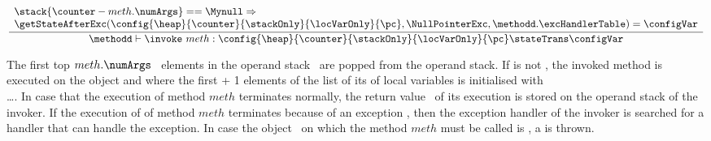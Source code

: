 \begin{itemize}
	  $$ \frac{\begin{array}{l}
	                         \stack{ \counter - meth.\numArgs } == \Mynull \Rightarrow \\ 
				 \getStateAfterExc( \config{\heap}{\counter}{\stackOnly}{\locVarOnly}{\pc},\NullPointerExc,\methodd.\excHandlerTable ) =  \configVar
	         \end{array} 	      
	         }	         
	         {\methodd \vdash \invoke \  meth :  \config{\heap}{\counter}{\stackOnly}{\locVarOnly}{\pc} 
		                        \stateTrans  
					\configVar}$$					
	  

	 The first top $meth.\numArgs$ \ elements in the operand stack \stackOnly \ are popped from the operand stack. If 
          is not \Mynull, the invoked method is executed on the object    
	 and where the first \numArgs + 1 elements of the list of its of local variables is initialised with \\
          \ldots \stack{\counter}. In case that the execution of method $meth$
	 terminates normally, the return value \Res \  of its execution is stored on the operand stack of the invoker. 
	 If the execution of of method $meth$ terminates because of an exception \Exc, then the exception handler of the invoker is searched for
	 a handler that can handle the exception. In case the object   \  on which the  method $meth$ must be 
	 called is \Mynull, a \NullPointerExc is thrown.  			





\end{itemize}


